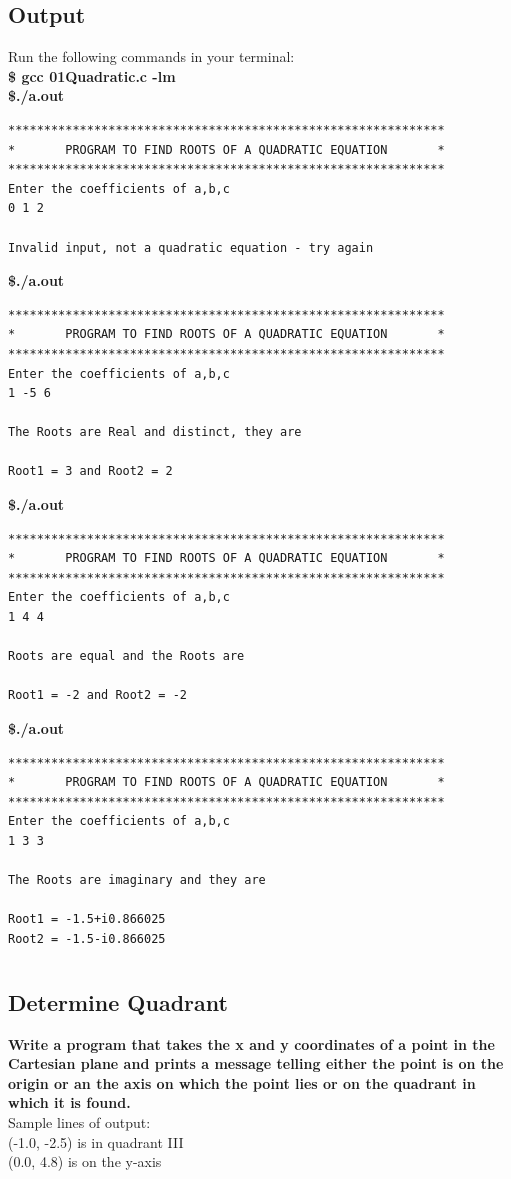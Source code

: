\documentclass[a4paper]{report}
\begin{document}
\section*{Output}
Run the following commands in your terminal:\\
\textbf{\$ gcc 01Quadratic.c -lm \\ \$./a.out }
\begin{Verbatim}
*************************************************************
*       PROGRAM TO FIND ROOTS OF A QUADRATIC EQUATION       *
*************************************************************
Enter the coefficients of a,b,c 
0 1 2

Invalid input, not a quadratic equation - try again
\end{Verbatim}
\textbf{\$./a.out }
\begin{Verbatim}
*************************************************************
*       PROGRAM TO FIND ROOTS OF A QUADRATIC EQUATION       *
*************************************************************
Enter the coefficients of a,b,c 
1 -5 6

The Roots are Real and distinct, they are 

Root1 = 3 and Root2 = 2
\end{Verbatim}
\textbf{\$./a.out }
\begin{Verbatim}
*************************************************************
*       PROGRAM TO FIND ROOTS OF A QUADRATIC EQUATION       *
*************************************************************
Enter the coefficients of a,b,c 
1 4 4

Roots are equal and the Roots are 

Root1 = -2 and Root2 = -2
\end{Verbatim}
\textbf{\$./a.out }
\begin{Verbatim}
*************************************************************
*       PROGRAM TO FIND ROOTS OF A QUADRATIC EQUATION       *
*************************************************************
Enter the coefficients of a,b,c 
1 3 3

The Roots are imaginary and they are

Root1 = -1.5+i0.866025
Root2 = -1.5-i0.866025
\end{Verbatim}

\chapter{}
\section{Determine Quadrant}
{\selectfont \textbf{Write a program that takes the x and y coordinates of a point in the Cartesian plane and prints a message telling either the point is on the origin or an the axis on which the point lies or on the quadrant in which it is found.\\ }
Sample lines of output: \\
(-1.0, -2.5) is in quadrant III \\
(0.0, 4.8) is on the y-axis \\
}
\end{document}
